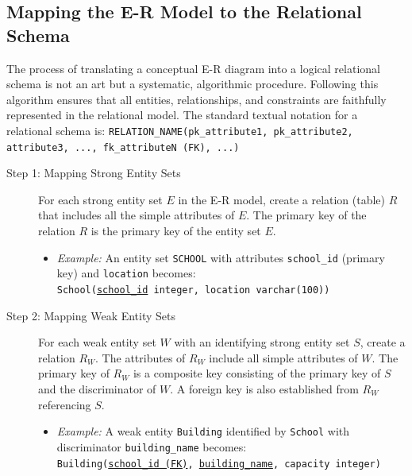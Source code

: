 \subsection{Mapping the E-R Model to the Relational Schema}
The process of translating a conceptual E-R diagram into a logical relational schema is not an art but a systematic, algorithmic procedure. Following this algorithm ensures that all entities, relationships, and constraints are faithfully represented in the relational model. The standard textual notation for a relational schema is:
\texttt{RELATION\_NAME(pk\_attribute1, pk\_attribute2, attribute3, ..., fk\_attributeN (FK), ...)}

\begin{description}
    \item[Step 1: Mapping Strong Entity Sets] For each strong entity set $E$ in the E-R model, create a relation (table) $R$ that includes all the simple attributes of $E$. The primary key of the relation $R$ is the primary key of the entity set $E$.
    \begin{itemize}
        \item \textit{Example:} An entity set \texttt{SCHOOL} with attributes \texttt{school\_id} (primary key) and \texttt{location} becomes: \\
        \texttt{School(\underline{school\_id} integer, location varchar(100))}
    \end{itemize}

    \item[Step 2: Mapping Weak Entity Sets] For each weak entity set $W$ with an identifying strong entity set $S$, create a relation $R_W$. The attributes of $R_W$ include all simple attributes of $W$. The primary key of $R_W$ is a composite key consisting of the primary key of $S$ and the discriminator of $W$. A foreign key is also established from $R_W$ referencing $S$.
    \begin{itemize}
        \item \textit{Example:} A weak entity \texttt{Building} identified by \texttt{School} with discriminator \texttt{building\_name} becomes: \\
        \texttt{Building(\underline{school\_id (FK)}, \underline{building\_name}, capacity integer)}
    \end{itemize}


\end{description}
